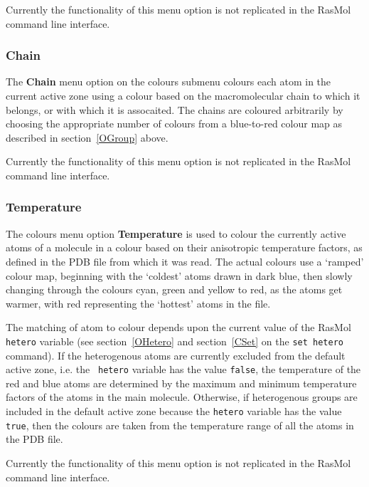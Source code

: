 Currently the functionality of this menu option is not replicated in the
RasMol command line interface.

\subsubsection{Chain}
\label{OChain}
The {\bf Chain} menu option on the colours submenu colours each atom in
the current active zone using a colour based on the macromolecular chain 
to which it belongs, or with which it is assocaited. The chains are 
coloured arbitrarily by choosing the appropriate number of colours from 
a blue-to-red colour map as described in section~\ref{OGroup} above.

Currently the functionality of this menu option is not replicated in the
RasMol command line interface.

\subsubsection{Temperature}
\label{OTemp}
The colours menu option {\bf Temperature} is used to colour the currently
active atoms of a molecule in a colour based on their anisotropic temperature
factors, as defined in the PDB file from which it was read. The actual 
colours use a `ramped' colour map, beginning with the `coldest' atoms drawn 
in dark blue, then slowly changing through the colours cyan, green and yellow 
to red, as the atoms get warmer, with red representing the `hottest' atoms 
in the file.

The matching of atom to colour depends upon the current value of the
RasMol {\tt hetero} variable (see section~\ref{OHetero} and 
section~\ref{CSet} on the {\tt set hetero} command). If the heterogenous 
atoms are currently excluded from the default active zone, i.e. the {\tt 
hetero} variable has the value {\tt false}, the temperature of the red 
and blue atoms are determined by the maximum and minimum temperature 
factors of the atoms in the main molecule. Otherwise, if heterogenous 
groups are included in the default active zone because the {\tt hetero} 
variable has the value {\tt true}, then the colours are taken from the 
temperature range of all the atoms in the PDB file.

Currently the functionality of this menu option is not replicated in the
RasMol command line interface.

